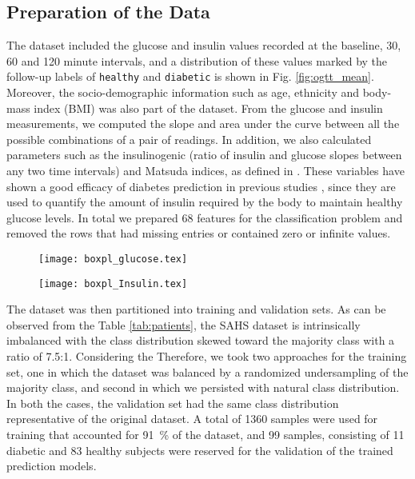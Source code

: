 \documentclass[journal,comsoc]{IEEEtran}
\begin{document}
\subsection{Preparation of the Data}
%
The dataset included the glucose and insulin values recorded at the baseline, \num{30}, \num{60} and \num{120} minute intervals, and a distribution of these values marked by the follow-up labels of \texttt{healthy} and \texttt{diabetic} is shown in Fig. \ref{fig:ogtt_mean}. Moreover, the socio-demographic information such as age, ethnicity and body-mass index (BMI) was also part of the dataset. From the glucose and insulin measurements, we computed the slope and area under the curve between all the possible combinations  of a pair of readings. In addition, we also calculated parameters such as the insulinogenic (ratio of insulin and glucose slopes between any two time intervals) and Matsuda indices, as defined in \cite{Matsuda1462,abdul-ghani_plasma_2009}. These variables have shown a good efficacy of diabetes prediction in previous studies \cite{abdul-ghani_what_2007,abdul-ghani_plasma_2009}, since they are used to quantify the amount of insulin required by the body to maintain healthy glucose levels. In total we prepared \num{68} features for the classification problem and removed the rows that had missing entries or contained zero or infinite values.
%
\begin{figure*}
    \centering
    \begin{subfigure}[b]{\columnwidth}        %
        \centering
        \texttt{[image: boxpl\_glucose.tex]}
        \label{fig:glucose}
    \end{subfigure}
    \hfill
    \begin{subfigure}[b]{\columnwidth}        %
        \centering
        \texttt{[image: boxpl\_Insulin.tex]}
        \label{fig:insulin}
    \end{subfigure}
    \caption{Box plots of glucose and insulin measurements for healthy and diabetic subjects.}
    \label{fig:ogtt_mean}
\end{figure*}
%
The dataset was then partitioned into training and validation sets. As can be observed from the Table \ref{tab:patients}, the SAHS dataset is intrinsically imbalanced with the class distribution skewed toward the majority class with a ratio of 7.5:1. Considering the Therefore, we took two approaches for the training set, one in which the dataset was balanced by a randomized undersampling of the majority class, and second in which we persisted with natural class distribution. In both the cases, the validation set had the same class distribution representative of the original dataset. A total of \num{1360} samples were used for training that accounted for \SI{91}{\percent} of the dataset, and \num{99} samples, consisting of \num{11} diabetic and \num{83} healthy subjects were reserved for the validation of the trained prediction models.
%
%
\end{document}
